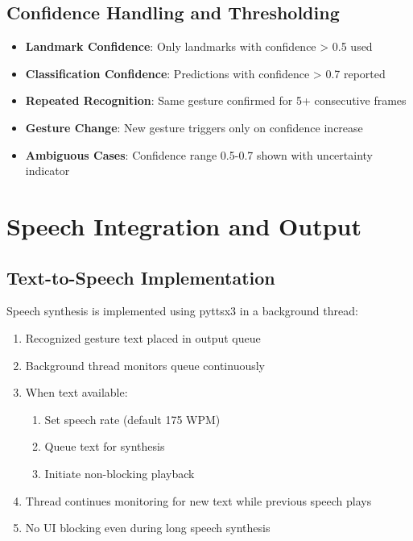 \subsection{Confidence Handling and Thresholding}

\begin{itemize}
    \item \textbf{Landmark Confidence}: Only landmarks with confidence > 0.5 used
    \item \textbf{Classification Confidence}: Predictions with confidence > 0.7 reported
    \item \textbf{Repeated Recognition}: Same gesture confirmed for 5+ consecutive frames
    \item \textbf{Gesture Change}: New gesture triggers only on confidence increase
    \item \textbf{Ambiguous Cases}: Confidence range 0.5-0.7 shown with uncertainty indicator
\end{itemize}

\section{Speech Integration and Output}

\subsection{Text-to-Speech Implementation}

Speech synthesis is implemented using pyttsx3 in a background thread:
\begin{enumerate}
    \item Recognized gesture text placed in output queue
    \item Background thread monitors queue continuously
    \item When text available:
    \begin{enumerate}
        \item Set speech rate (default 175 WPM)
        \item Queue text for synthesis
        \item Initiate non-blocking playback
    \end{enumerate}
    \item Thread continues monitoring for new text while previous speech plays
    \item No UI blocking even during long speech synthesis
\end{enumerate}

